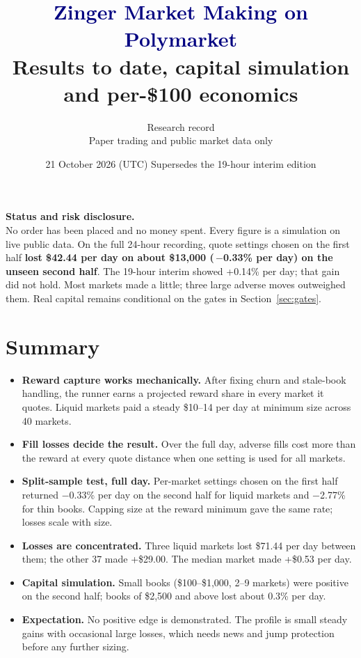 \documentclass[11pt,a4paper]{article}
\title{\textcolor{navy}{\textbf{Zinger Market Making on Polymarket}}\\[0.3em]
\large Results to date, capital simulation and per-\$100 economics}
\author{Research record \\ Paper trading and public market data only}
\date{21 October 2026 (UTC) \quad Supersedes the 19-hour interim edition}
\begin{document}
\maketitle
\thispagestyle{empty}

\begin{callout}
\textbf{Status and risk disclosure.}\\
No order has been placed and no money spent. Every figure is a simulation on live public data.
On the full 24-hour recording, quote settings chosen on the first half \textbf{lost \$42.44 per day on about \$13,000 (\,$-$0.33\% per day) on the unseen second half}. The 19-hour interim showed +0.14\% per day; that gain did not hold.
Most markets made a little; three large adverse moves outweighed them. Real capital remains conditional on the gates in Section~\ref{sec:gates}.
\end{callout}

\section{Summary}
\begin{itemize}[leftmargin=1.2em]
  \item \textbf{Reward capture works mechanically.} After fixing churn and stale-book handling, the runner earns a projected reward share in every market it quotes. Liquid markets paid a steady \$10--14 per day at minimum size across 40 markets.
  \item \textbf{Fill losses decide the result.} Over the full day, adverse fills cost more than the reward at every quote distance when one setting is used for all markets.
  \item \textbf{Split-sample test, full day.} Per-market settings chosen on the first half returned $-$0.33\% per day on the second half for liquid markets and $-$2.77\% for thin books. Capping size at the reward minimum gave the same rate; losses scale with size.
  \item \textbf{Losses are concentrated.} Three liquid markets lost \$71.44 per day between them; the other 37 made +\$29.00. The median market made +\$0.53 per day.
  \item \textbf{Capital simulation.} Small books (\$100--\$1,000, 2--9 markets) were positive on the second half; books of \$2,500 and above lost about 0.3\% per day.
  \item \textbf{Expectation.} No positive edge is demonstrated. The profile is small steady gains with occasional large losses, which needs news and jump protection before any further sizing.
\end{itemize}
\end{document}
